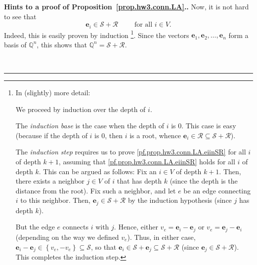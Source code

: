 \documentclass[numbers=enddot,12pt,final,onecolumn,notitlepage]{scrartcl}%
\theoremstyle{definition}
\newenvironment{proof}[1][Proof]{\noindent\textbf{#1.} }{\ \rule{0.5em}{0.5em}}
\newcommand{\QQ}{\mathbb{Q}}
\newcommand{\set}[1]{\left\{ #1 \right\}}
\begin{document}
\begin{proof}[Hints to a proof of Proposition~\ref{prop.hw3.conn.LA}.]
Now, it is not hard to see that
\begin{equation}
\mathbf{e}_i \in \mathcal{S} + \mathcal{R}
\qquad \text{ for all } i \in V .
\label{pf.prop.hw3.conn.LA.eiinSR}
\end{equation}
Indeed, this is easily proven by induction
\footnote{In (slightly) more detail:
  \par
  We proceed by induction over the depth of $i$.
  \par
  The \textit{induction base} is the case when the depth
  of $i$ is $0$.
  This case is easy (because if the depth of $i$ is $0$,
  then $i$ is a root, whence $\mathbf{e}_i \in \mathcal{R}
  \subseteq \mathcal{S} + \mathcal{R}$).
  \par
  The \textit{induction step} requires us to prove
  \eqref{pf.prop.hw3.conn.LA.eiinSR} for all $i$ of depth
  $k+1$, assuming that \eqref{pf.prop.hw3.conn.LA.eiinSR}
  holds for all $i$ of depth $k$.
  This can be argued as follows:
  Fix an $i \in V$ of depth $k+1$.
  Then, there exists a neighbor $j \in V$ of $i$ that has
  depth $k$ (since the depth is the distance from the
  root).
  Fix such a neighbor, and let $e$ be an edge connecting
  $i$ to this neighbor.
  Then, $\mathbf{e}_j \in \mathcal{S} + \mathcal{R}$
  by the induction hypothesis (since $j$ has depth $k$).
  \par
  But the edge $e$ connects $i$ with $j$.
  Hence, either $v_e = \mathbf{e}_i - \mathbf{e}_j$ or
  $v_e = \mathbf{e}_j - \mathbf{e}_i$ (depending on the
  way we defined $v_e$).
  Thus, in either case,
  $\mathbf{e}_i - \mathbf{e}_j \in \set{v_e, -v_e}
  \subseteq \mathcal{S}$, so that
  $\mathbf{e}_i \in \mathcal{S} + \mathbf{e}_j
  \subseteq \mathcal{S} + \mathcal{R}$
  (since $\mathbf{e}_j \in \mathcal{S} + \mathcal{R}$).
  This completes the induction step.}.
Since the vectors $\mathbf{e}_1, \mathbf{e}_2, \ldots,
\mathbf{e}_n$ form a basis of $\QQ^n$,
this shows that
$\QQ^n = \mathcal{S} + \mathcal{R}$.


\end{proof}
\end{document}
